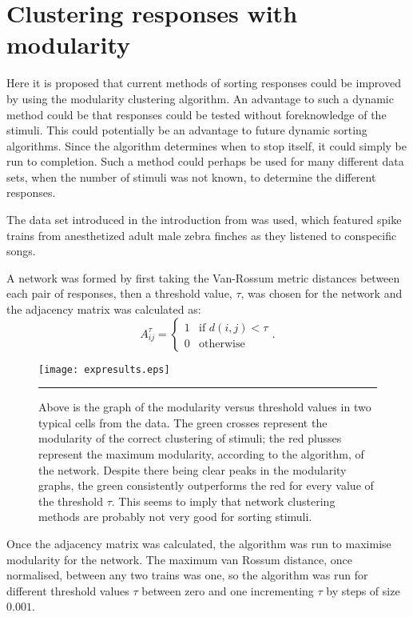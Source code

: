 \section{Clustering responses with modularity}

Here it is proposed that current methods of sorting 
responses could be improved by using the modularity clustering algorithm.  An advantage to such 
a dynamic method could be that responses could be tested without foreknowledge of the stimuli.  This could potentially be an advantage to future dynamic sorting algorithms. Since the algorithm determines when to stop itself, it 
could simply be run to completion.  Such a method could perhaps be used for 
many different data sets, when the number of stimuli was not known, to 
determine the different responses.

The data set introduced in the introduction from \citep{NarayanEtAl2006b} was used, which featured spike trains 
from anesthetized adult male zebra finches as they listened to conspecific 
songs.

A network was formed by first taking the Van-Rossum metric distances between 
each pair of responses, then a threshold value, $\tau$, was chosen for the network 
and the adjacency matrix was calculated as:
\begin{equation}
A^{\tau}_{ij} = \left\{ \begin{array}{ll} 1 & \mbox{if }d(i,j)<\tau \\
0 & \mbox{otherwise}
\end{array}\right. .
\end{equation}

\begin{figure}[h!tb]
  \centering
  \texttt{[image: expresults.eps]}
  \rule{35em}{0.5pt}
  \caption{Above is the graph of the modularity versus threshold values
    in two typical cells from the data.  The green crosses represent the 
    modularity of the correct clustering of stimuli; the red plusses represent 
    the maximum modularity, according to the algorithm, of the network.
    Despite there being clear peaks in the modularity graphs, the green 
    consistently outperforms the red for every value of the threshold $\tau$.  
    This seems to imply that network clustering methods are probably not very 
    good for sorting stimuli.  \label{graphs}}
\end{figure}

Once the adjacency matrix was calculated, the algorithm was run to 
maximise modularity for the network.  The maximum van Rossum 
distance, once normalised, between any two trains was one, so the algorithm was run for different 
threshold values $\tau$ between zero and one incrementing $\tau$ by steps of 
size $0.001$.

